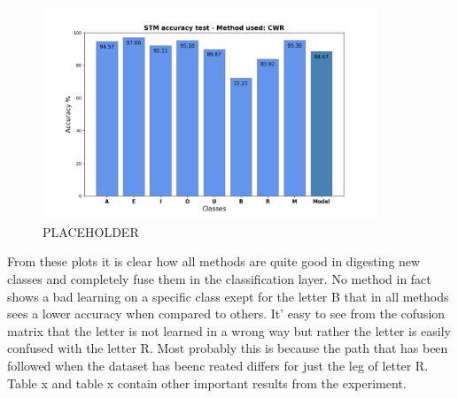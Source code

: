 \documentclass[12pt]{report}
\begin{document}
%
%
\begin{figure}[h!]
    \centering
    \includegraphics[width=100mm]{Figures/Chapter5/STM_barPlot_CWR.jpg} 
    \caption{PLACEHOLDER}
    \label{fig:letter_res_CWR}    
\end{figure}
%
From these plots it is clear how all methods are quite good in digesting new classes and completely fuse them in the classification layer. No method in fact shows a bad learning on a specific class exept for the letter B that in all methods sees a lower accuracy when compared to others. It' easy to see from the cofusion matrix that the letter is not learned in a wrong way but rather the letter is easily confused with the letter R. Most probably this is because the path that has been followed when the dataset has beenc reated differs for just the leg of letter R. \\
Table x and table x contain other important results from the experiment. 
%
\end{document}
